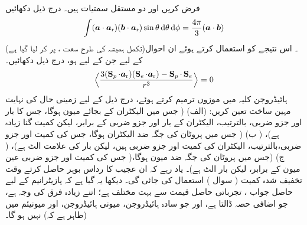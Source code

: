  
فرض کریں  اور  دو مستقل سمتیات ہیں۔ درج ذیل دکھائیں
\begin{align}
 \int(\kvec{a} \cdot \kvec{\kvecsub{a}{r}}) (\kvec{b} \cdot \kvec{\kvecsub{a}{r}}) \sin \theta \dif \theta \dif \phi = \frac{4 \pi}{3} (\kvec{a} \cdot \kvec{b})
\end{align}
(تکمل ہمیشہ کی طرح سعت ، پر کر لیا گیا ہے)۔ اس نتیجے کو استعمال کرتے ہوئے ان احوال کے لیے جن کے لیے  ہو، درج ذیل دکھائیں۔
\begin{align*}
\Big\langle \frac{3 (\operatorname{\mathbf{S}}_p \cdot {\ensuremath{{\boldsymbol{a}}}_{\textup{r}}})(\operatorname{\mathbf{S}}_e \cdot {\ensuremath{{\boldsymbol{a}}}_{\textup{r}}}) - \operatorname{\mathbf{S}}_p \cdot \operatorname{\mathbf{S}}_e}{r^3} \Big \rangle = 0
\end{align*}
  
ہائیڈروجن کلیہ میں موزوں ترمیم کرتے ہوئے، درج ذیل کے لیے زمینی حال کی نہایت مہین ساخت تعین کریں: (الف)  ( جس میں الیکٹران کے بجائے میون ہوگا، جس کا بار اور  جزو ضربی، بالترتیب، الیکٹران کے بار اور  جزو ضربی کے برابر، لیکن کمیت  گنا زیادہ ہے)، ( ب)  ( جس میں پروٹان کی جگہ ضد الیکٹران ہوگا، جس کی کمیت اور  جزو ضربی،بالترتیب، الیکٹران کی کمیت اور  جزو ضربی ہیں، لیکن بار کی علامت الٹ ہے)، ( ج)  (جس میں پروٹان کی جگہ ضد میون ہوگا،( جس کی کمیت اور  جزو ضربی عین میون کے برابر، لیکن بار الٹ ہے)۔  یاد رہے کہ ان عجیب کا رداس بوہر حاصل کرتے وقت تخفیف شدہ کمیت
( سوال ) استعمال کی جائی گی۔ دیکھا یہ گیا ہے کہ پازیٹرانیم کے لیے حاصل جواب ، تجرباتی
 حاصل قیمت  سے بہت مختلف ہے؛ اتنے زیادہ فرق کی وجہ   ہے، جو اضافی  حصہ ڈالتا ہے، اور جو سادہ ہائیڈروجن، میونی ہائیڈروجن، اور میونیئم میں (ظاہر ہے کہ) نہیں ہو گا۔ 


